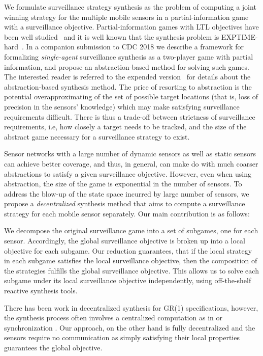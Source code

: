 We formulate surveillance strategy synthesis as the problem of computing a joint winning strategy for the multiple mobile sensors in a partial-information game with a surveillance objective. Partial-information games with LTL objectives have been well studied~\cite{DoyenR11,Chatterjee2013} and it is well known that the synthesis problem is EXPTIME-hard~\cite{Reif84,BerwangerD08}. In a companion submission to CDC 2018 we describe a framework for formalizing \emph{single-agent} surveillance synthesis as a two-player game with partial information, and propose an abstraction-based method for solving such games. The interested reader is referred to the expended version~\cite{arxiv} for details about the abstraction-based synthesis method. The price of resorting to abstraction is the potential overapproximating of the set of possible target locations (that is, loss of precision in the sensors' knowledge) which may make satisfying surveillance requirements difficult. There is thus a trade-off between strictness of surveillance requirements, i.e, how closely a target needs to be tracked, and the size of the abstract game necessary for a surveillance strategy to exist. 

Sensor networks with a large number of dynamic sensors as well as static sensors can achieve better coverage, and thus, in general, can make do with much coarser abstractions to satisfy a given surveillance objective. However, even when using abstraction, the size of the game is exponential in the number of sensors. To address the blow-up of the state space incurred by large number of sensors, we propose a \emph{decentralized} synthesis method that aims to compute a surveillance strategy for each mobile sensor separately. Our main contribution is as follows:

 We decompose the original surveillance game into a set of subgames, one for each sensor. Accordingly, the global surveillance objective is  broken up into a local objective for each subgame. Our reduction guarantees, that if the local strategy in each subgame satisfies the local surveillance objective, then the composition of the strategies fulfills the global surveillance objective. This allows us to solve each subgame under its local surveillance objective independently, using off-the-shelf reactive synthesis tools. 

 There has been work in decentralized synthesis for GR(1) specifications, however, the synthesis process often involves a centralized computation as in \cite{Kloetzer06} or synchronization \cite{Salar17,Kloetzer11}. Our approach, on the other hand is fully  decentralized and the sensors require no communication as simply satisfying their local properties guarantees the global objective.

